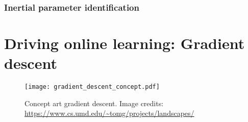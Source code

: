 \subsubsection{Inertial parameter identification}









\section{Driving online learning: Gradient descent}
\begin{figure}[h!]
	\begin{center}
		\texttt{[image: gradient\_descent\_concept.pdf]}
	\end{center}
	\caption{Concept art gradient descent. Image credits: \url{https://www.cs.umd.edu/~tomg/projects/landscapes/}}
\end{figure}

